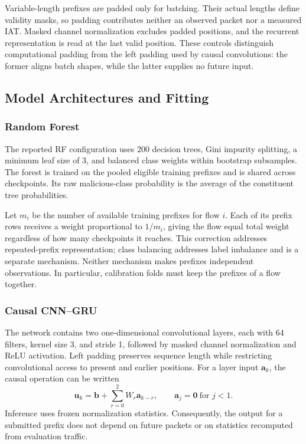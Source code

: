 \documentclass[conference]{IEEEtran}
\begin{document}
Variable-length prefixes are padded only for batching. Their actual lengths define validity masks, so padding contributes neither an observed packet nor a measured IAT. Masked channel normalization excludes padded positions, and the recurrent representation is read at the last valid position. These controls distinguish computational padding from the left padding used by causal convolutions: the former aligns batch shapes, while the latter supplies no future input.

\subsection{Model Architectures and Fitting}
\subsubsection{Random Forest}
The reported RF configuration uses 200 decision trees, Gini impurity splitting, a minimum leaf size of 3, and balanced class weights within bootstrap subsamples. The forest is trained on the pooled eligible training prefixes and is shared across checkpoints. Its raw malicious-class probability is the average of the constituent tree probabilities.

Let $m_i$ be the number of available training prefixes for flow $i$. Each of its prefix rows receives a weight proportional to $1/m_i$, giving the flow equal total weight regardless of how many checkpoints it reaches. This correction addresses repeated-prefix representation; class balancing addresses label imbalance and is a separate mechanism. Neither mechanism makes prefixes independent observations. In particular, calibration folds must keep the prefixes of a flow together.

\subsubsection{Causal CNN--GRU}
The network contains two one-dimensional convolutional layers, each with 64 filters, kernel size 3, and stride 1, followed by masked channel normalization and ReLU activation. Left padding preserves sequence length while restricting convolutional access to present and earlier positions. For a layer input $\mathbf{a}_k$, the causal operation can be written
\begin{equation}
\mathbf{u}_k=\mathbf{b}+
\sum_{r=0}^{2}W_r\mathbf{a}_{k-r},
\qquad \mathbf{a}_{j}=\mathbf{0}\ \text{for }j<1.
\label{eq:causal_convolution}
\end{equation}
Inference uses frozen normalization statistics. Consequently, the output for a submitted prefix does not depend on future packets or on statistics recomputed from evaluation traffic.
\end{document}
